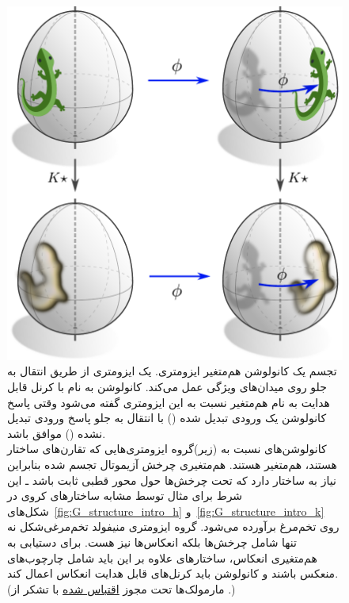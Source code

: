 \begin{figure}
	\centering
	\hspace*{2ex}
	\includegraphics[width=.5\textwidth]{figures/lizard_conv_egg_intro.pdf}
	\captionsetup{width=.9\textwidth}
	\caption[]{\small
		تجسم یک کانولوشن \lr{$\GM$} هم‌متغیر ایزومتری.
		یک ایزومتری \lr{$\phi$} از طریق انتقال به جلو روی میدان‌های ویژگی عمل می‌کند.
		کانولوشن \lr{$\GM$} به نام  با کرنل قابل هدایت  به نام  هم‌متغیر نسبت به این ایزومتری گفته می‌شود وقتی پاسخ کانولوشن یک ورودی تبدیل شده (\lr{$\rightarrow,\downarrow$}) با انتقال به جلو پاسخ ورودی تبدیل نشده (\lr{$\downarrow,\rightarrow$}) موافق باشد.
		\\[1ex]
		کانولوشن‌های \lr{$\GM$} نسبت به (زیر)گروه  ایزومتری‌هایی که تقارن‌های ساختار  هستند، هم‌متغیر هستند.
		هم‌متغیری چرخش آزیموتال تجسم شده بنابراین نیاز به ساختار  دارد که تحت چرخش‌ها حول محور قطبی ثابت باشد ـ این شرط برای مثال توسط مشابه ساختارهای  کروی در شکل‌های~\ref{fig:G_structure_intro_h} و~\ref{fig:G_structure_intro_k} روی تخم‌مرغ برآورده می‌شود.
		گروه ایزومتری منیفولد تخم‌مرغی‌شکل نه تنها شامل چرخش‌ها بلکه انعکاس‌ها نیز هست.
		برای دستیابی به هم‌متغیری انعکاس، ساختارهای  علاوه بر این باید شامل چارچوب‌های منعکس باشند و کانولوشن \lr{$\GM$} باید کرنل‌های قابل هدایت انعکاس اعمال کند.
		{\\
			\color{gray}
			\scriptsize
			(مارمولک‌ها تحت مجوز 
			\href{https://github.com/twitter/twemoji/blob/gh-pages/LICENSE-GRAPHICS}{\underline{اقتباس شده}}
			با تشکر از .)
		}
		\\[-16pt]
	}
	\label{fig:lizard_conv_egg_intro}
\end{figure}



